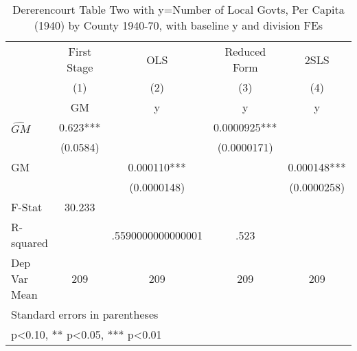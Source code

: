 \begin{table}[htbp]\centering
\def\sym#1{\ifmmode^{#1}\else\(^{#1}\)\fi}
\caption{Dererencourt Table Two with y=Number of Local Govts, Per Capita (1940) by County 1940-70, with baseline y and division FEs}
\begin{tabular}{l*{4}{c}}
\toprule
                    & First Stage   &         OLS   &Reduced Form   &        2SLS   \\
                    &\multicolumn{1}{c}{(1)}&\multicolumn{1}{c}{(2)}&\multicolumn{1}{c}{(3)}&\multicolumn{1}{c}{(4)}\\
                    &\multicolumn{1}{c}{GM}&\multicolumn{1}{c}{y}&\multicolumn{1}{c}{y}&\multicolumn{1}{c}{y}\\
\midrule
$\hat{GM}$          &       0.623***&               &   0.0000925***&               \\
                    &    (0.0584)   &               & (0.0000171)   &               \\
\addlinespace
GM                  &               &    0.000110***&               &    0.000148***\\
                    &               & (0.0000148)   &               & (0.0000258)   \\
\midrule
F-Stat              &      30.233   &               &               &               \\
R-squared           &               &.5590000000000001   &        .523   &               \\
Dep Var Mean        &         209   &         209   &         209   &         209   \\
\bottomrule
\multicolumn{5}{l}{\footnotesize Standard errors in parentheses}\\
\multicolumn{5}{l}{\footnotesize * p<0.10, ** p<0.05, *** p<0.01}\\
\end{tabular}
\end{table}
